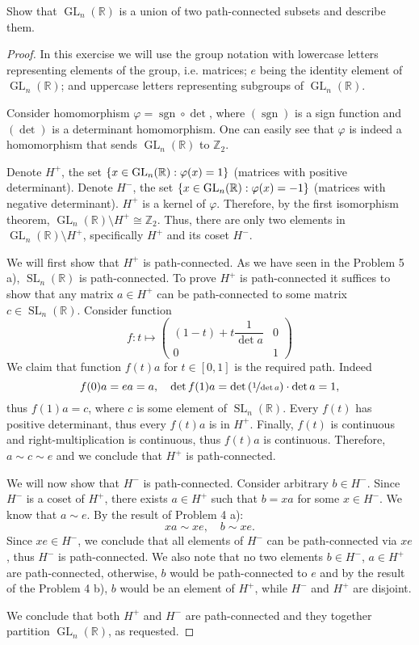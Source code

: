 \documentclass{article}
\theoremstyle{definition}
\newcommand{\R}{\mathbb{R}}
\newcommand{\Z}{\mathbb{Z}}
\newcommand{\GL}{\operatorname{GL}}
\newcommand{\SL}{\operatorname{SL}}
\newcommand{\GLnR}{\GL_n(\R)}
\newcommand{\SLnR}{\SL_n(\R)}
\newcommand{\sgn}{\operatorname{sgn}}
\DeclarePairedDelimiter\set{\{}{\}}
\begin{document}
\begin{tcolorbox}
Show that $\GLnR$ is a union of two path-connected subsets and describe them.
\end{tcolorbox}
\begin{proof}

In this exercise we will use the group notation with lowercase letters representing elements of the group, i.e. matrices; $e$ being the identity element of $\GLnR$; and uppercase letters representing subgroups of $\GLnR$.

Consider homomorphism $\varphi = \sgn \circ \det$, where $(\sgn)$ is a sign function and $(\det)$ is a determinant homomorphism.
One can easily see that $\varphi$ is indeed a homomorphism that sends $\GLnR$ to $\Z_2$.

Denote $H^+$, the set $\set{ x \in \GLnR : \varphi(x) = 1}$ (matrices with positive determinant).
Denote $H^-$, the set $\set{ x \in \GLnR : \varphi(x) = -1}$ (matrices with negative determinant).
$H^+$ is a kernel of $\varphi$.
Therefore, by the first isomorphism theorem, $\GLnR \setminus H^+ \cong \Z_2$.
Thus, there are only two elements in $\GLnR \setminus H^+$, specifically $H^+$ and its coset $H^-$.

We will first show that $H^+$ is path-connected.
As we have seen in the Problem 5 a), $\SLnR$ is path-connected.
To prove $H^+$ is path-connected it suffices to show that any matrix $a \in H^+$ can be path-connected to some matrix $c \in \SLnR$.
Consider function
\[
f : t \longmapsto
\begin{pmatrix}
    (1-t) + t\dfrac{1}{\det a} & 0 \\
    0 & 1
\end{pmatrix}
\]
We claim that function $f(t)a$ for $t \in [0,1]$ is the required path.
Indeed
\[ f(0)a = ea = a, \quad \det f(1)a = \det \left( \nicefrac{1}{\det a} \right) \cdot \det a = 1, \]
thus $f(1)a = c$, where $c$ is some element of $\SLnR$.
Every $f(t)$ has positive determinant, thus every $f(t)a$ is in $H^+$. 
Finally, $f(t)$ is continuous and right-multiplication is continuous, thus $f(t)a$ is continuous.
Therefore, $a \sim c \sim e$ and we conclude that $H^+$ is path-connected.

We will now show that $H^-$ is path-connected.
Consider arbitrary $b \in H^-$.
Since $H^-$ is a coset of $H^+$, there exists $a \in H^+$ such that $b = xa$ for some $x \in H^-$.
We know that $a \sim e$.
By the result of Problem 4 a):
\[ xa \sim xe, \quad b \sim xe. \]
Since $xe \in H^-$, we conclude that all elements of $H^-$ can be path-connected via $xe$, thus $H^-$ is path-connected. We also note that no two elements $b \in H^-$, $a \in H^+$ are path-connected, otherwise, $b$ would be path-connected to $e$ and by the result of the Problem 4 b), $b$ would be an element of $H^+$, while $H^-$ and $H^+$ are disjoint.

We conclude that both $H^+$ and $H^-$ are path-connected and they together partition $\GLnR$, as requested.

\end{proof}
\end{document}
